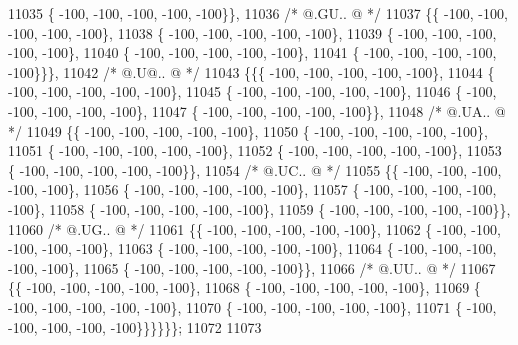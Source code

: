 \begin{DoxyCode}
11035 \{ -100, -100, -100, -100, -100\}\},
11036 \textcolor{comment}{/*  @.GU.. @ */}
11037 \{\{ -100, -100, -100, -100, -100\},
11038 \{ -100, -100, -100, -100, -100\},
11039 \{ -100, -100, -100, -100, -100\},
11040 \{ -100, -100, -100, -100, -100\},
11041 \{ -100, -100, -100, -100, -100\}\}\},
11042 \textcolor{comment}{/*  @.U@.. @ */}
11043 \{\{\{ -100, -100, -100, -100, -100\},
11044 \{ -100, -100, -100, -100, -100\},
11045 \{ -100, -100, -100, -100, -100\},
11046 \{ -100, -100, -100, -100, -100\},
11047 \{ -100, -100, -100, -100, -100\}\},
11048 \textcolor{comment}{/*  @.UA.. @ */}
11049 \{\{ -100, -100, -100, -100, -100\},
11050 \{ -100, -100, -100, -100, -100\},
11051 \{ -100, -100, -100, -100, -100\},
11052 \{ -100, -100, -100, -100, -100\},
11053 \{ -100, -100, -100, -100, -100\}\},
11054 \textcolor{comment}{/*  @.UC.. @ */}
11055 \{\{ -100, -100, -100, -100, -100\},
11056 \{ -100, -100, -100, -100, -100\},
11057 \{ -100, -100, -100, -100, -100\},
11058 \{ -100, -100, -100, -100, -100\},
11059 \{ -100, -100, -100, -100, -100\}\},
11060 \textcolor{comment}{/*  @.UG.. @ */}
11061 \{\{ -100, -100, -100, -100, -100\},
11062 \{ -100, -100, -100, -100, -100\},
11063 \{ -100, -100, -100, -100, -100\},
11064 \{ -100, -100, -100, -100, -100\},
11065 \{ -100, -100, -100, -100, -100\}\},
11066 \textcolor{comment}{/*  @.UU.. @ */}
11067 \{\{ -100, -100, -100, -100, -100\},
11068 \{ -100, -100, -100, -100, -100\},
11069 \{ -100, -100, -100, -100, -100\},
11070 \{ -100, -100, -100, -100, -100\},
11071 \{ -100, -100, -100, -100, -100\}\}\}\}\}\};
11072 
11073 
\end{DoxyCode}
